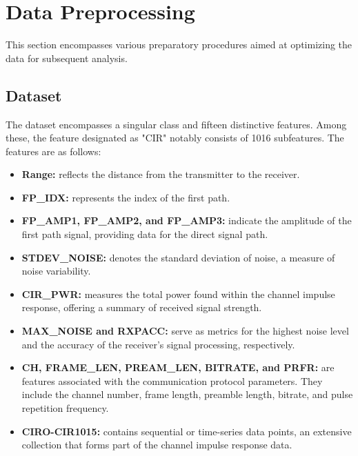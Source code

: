 \section{Data Preprocessing}\label{data_preprocessing}

This section encompasses various preparatory procedures aimed at optimizing the data for subsequent analysis. 

\subsection{Dataset}\label{dataset_given}

The dataset encompasses a singular class and fifteen distinctive features. Among these, the feature designated as "CIR" notably consists of 1016 subfeatures. The features are as follows:

\begin{itemize}
    \item \textbf{Range:} reflects the distance from the transmitter to the receiver.
    \item \textbf{FP\_IDX:} represents the index of the first path.
    \item \textbf{FP\_AMP1, FP\_AMP2, and FP\_AMP3:} indicate the amplitude of the first path signal, providing data for the direct signal path.
    \item \textbf{STDEV\_NOISE:} denotes the standard deviation of noise, a measure of noise variability.
    \item \textbf{CIR\_PWR:} measures the total power found within the channel impulse response, offering a summary of received signal strength.
    \item \textbf{MAX\_NOISE and RXPACC:} serve as metrics for the highest noise level and the accuracy of the receiver's signal processing, respectively.
    \item \textbf{CH, FRAME\_LEN, PREAM\_LEN, BITRATE, and PRFR:} are features associated with the communication protocol parameters. They include the channel number, frame length, preamble length, bitrate, and pulse repetition frequency.
    \item \textbf{CIRO-CIR1015:} contains sequential or time-series data points, an extensive collection that forms part of the channel impulse response data.
\end{itemize}


